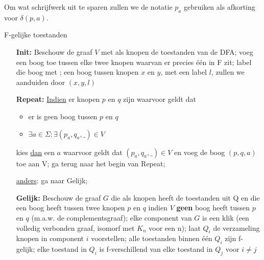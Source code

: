 Om wat schrijfwerk uit te sparen zullen we de notatie $p_a$ gebruiken
als afkorting voor $\delta(p,a)$.

\clearpage

\begin{algo} F-gelijke toestanden \label{gelijketoestanden}
\begin{enumerate}
\item[{\bf Init:}]
Beschouw de graaf $V$ met als knopen de toestanden van de DFA; voeg een
boog toe tussen elke twee knopen waarvan er precies \'{e}\'{e}n in F
zit; label die boog met \eps; een boog tussen knopen $x$ en $y$, met
een label $l$, zullen we aanduiden door $(x,y,l)$


\item[{\bf Repeat:}]
\underline{Indien} er knopen $p$ en $q$ zijn waarvoor geldt dat
\begin{itemize}
\item er is geen boog tussen $p$ en $q$
\item $\exists a \in \Sigma: \exists (p_a,q_a,\_) \in V$
\end{itemize}
kies \underline{dan} een $a$ waarvoor geldt dat $(p_a,q_a,\_) \in V$
en voeg de boog $(p,q,a)$ toe aan V; ga terug naar het begin van Repeat;

\underline{anders}: ga naar Gelijk;

\item[{\bf Gelijk:}]
Beschouw de graaf $G$ die als knopen heeft de toestanden uit Q en die
een boog heeft tussen twee knopen $p$ en $q$ indien $V$ {\bf geen} boog
heeft tussen $p$ en $q$ (m.a.w. de complementsgraaf); elke component
van $G$ is een klik (een volledig verbonden graaf, isomorf met $K_n$
voor een n); laat $Q_i$ de verzameling knopen in component $i$
voorstellen; alle toestanden binnen \'{e}\'{e}n $Q_i$ zijn f-gelijk;
elke toestand in $Q_i$ is f-verschillend van elke toestand in $Q_j$
voor $i \neq j$

\end{enumerate}

\end{algo}
